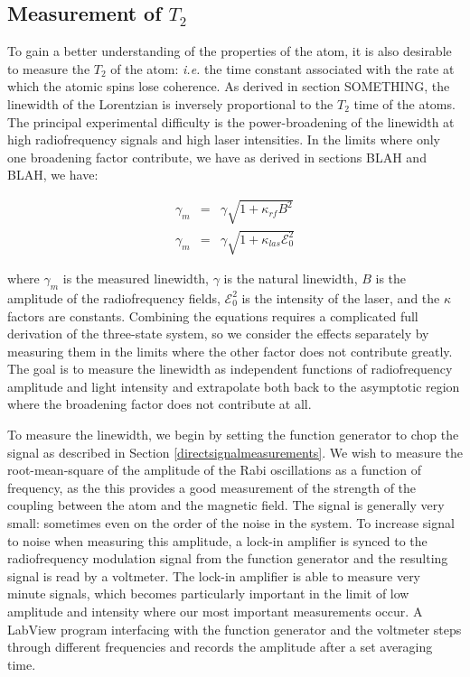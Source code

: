 \subsection{Measurement of $T_{2}$} \label{measurementoft2}

To gain a better understanding of the properties of the atom, it is also desirable to measure the $T_{2}$ of the atom: \emph{i.e.} the time constant associated with the rate at which the atomic spins lose coherence. As derived in section SOMETHING, the linewidth of the Lorentzian is inversely proportional to the $T_{2}$ time of the atoms. The principal experimental difficulty is the power-broadening of the linewidth at high radiofrequency signals and high laser intensities. In the limits where only one broadening factor contribute, we have as derived in sections BLAH and BLAH, we have:

\begin{eqnarray}
\gamma_{m} &=& \gamma \sqrt{1+ \kappa_{rf} B^{2}} \label{eq:rfbroad}\\
\gamma_{m} &=&\gamma \sqrt{1+ \kappa_{las} \mathcal{E}_{0}^{2}} \label{eq:lightbroad}
\end{eqnarray}

where $\gamma_{m}$ is the measured linewidth, $\gamma$ is the natural linewidth, $B$ is the amplitude of the radiofrequency fields, $\mathcal{E}_{0}^{2}$ is the intensity of the laser, and the $\kappa$ factors are constants. Combining the equations requires a complicated full derivation of the three-state system, so we consider the effects separately by measuring them in the limits where the other factor does not contribute greatly. The goal is to measure the linewidth as independent functions of radiofrequency amplitude and light intensity and extrapolate both back to the asymptotic region where the broadening factor does not contribute at all.

To measure the linewidth, we begin by setting the function generator to chop the signal as described in Section \ref{directsignalmeasurements}. We wish to measure the root-mean-square of the amplitude of the Rabi oscillations as a function of frequency, as the this provides a good measurement of the strength of the coupling between the atom and the magnetic field. The signal is generally very small: sometimes even on the order of the noise in the system. To increase signal to noise when measuring this amplitude, a lock-in amplifier is synced to the radiofrequency modulation signal from the function generator and the resulting signal is read by a voltmeter. The lock-in amplifier is able to measure very minute signals, which becomes particularly important in the limit of low amplitude and intensity where our most important measurements occur. A LabView program interfacing with the function generator and the voltmeter steps through different frequencies and records the amplitude after a set averaging time.


